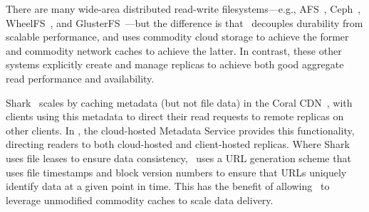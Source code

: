 There are many wide-area distributed read-write filesystems---e.g.,
AFS~\cite{afs}, Ceph~\cite{Ceph}, WheelFS~\cite{WheelFS}, and
GlusterFS~\cite{GlusterFS}---but the difference is that \Syndicate\ decouples durability from scalable performance, and uses commodity
cloud storage to achieve the former and commodity network caches to
achieve the latter. In contrast, these other systems explicitly create
and manage replicas to achieve both good aggregate read performance
and availability.

Shark~\cite{shark} scales by caching metadata (but not file data) in
the Coral CDN~\cite{coral}, with clients using this metadata to direct
their read requests to remote replicas on other clients. In \Syndicate,
the cloud-hosted Metadata Service provides this functionality,
directing readers to both cloud-hosted and client-hosted replicas.
Where Shark uses file leases to ensure data consistency, \Syndicate\ uses a URL generation scheme that uses file timestamps and block
version numbers to ensure that URLs uniquely identify data at a given
point in time.  This has the benefit of allowing \Syndicate\ to leverage
unmodified commodity caches to scale data delivery.


